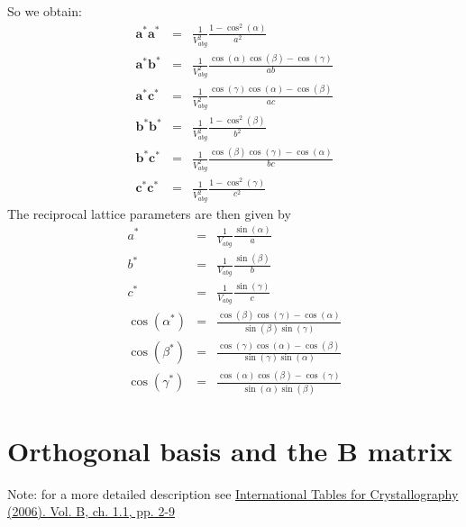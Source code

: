 \documentclass[prb]{revtex4}%
\begin{document}
So we obtain:
\begin{eqnarray}
  \textbf{a}^*\textbf{a}^* &=& \frac{1}{V_{abg} ^2} \frac{1-\cos^2(\alpha)}{a^2}\\
  \textbf{a}^*\textbf{b}^* &=& \frac{1}{V_{abg} ^2} \frac{\cos(\alpha) \cos(\beta)-\cos(\gamma)}{a b} \\
  \textbf{a}^*\textbf{c}^* &=& \frac{1}{V_{abg} ^2} \frac{\cos(\gamma) \cos(\alpha)-\cos(\beta)}{a c}\\
  \textbf{b}^*\textbf{b}^* &=& \frac{1}{V_{abg} ^2} \frac{1-\cos^2(\beta)}{b^2}\\
  \textbf{b}^*\textbf{c}^* &=& \frac{1}{V_{abg} ^2} \frac{\cos(\beta) \cos(\gamma)-\cos(\alpha)}{b c}\\
  \textbf{c}^*\textbf{c}^* &=& \frac{1}{V_{abg} ^2} \frac{1-\cos^2(\gamma)}{c^2}
\end{eqnarray}
The reciprocal lattice parameters are then given by
\begin{eqnarray}
  a^* &=& \frac{1}{V_{abg} } \frac{\sin(\alpha)}{a}\label{as}\\
  b^* &=& \frac{1}{V_{abg} } \frac{\sin(\beta)}{b}\label{bs}\\
  c^* &=& \frac{1}{V_{abg} } \frac{\sin(\gamma)}{c}\label{cs}\\
  \cos(\alpha^*) &=& \frac{\cos(\beta) \cos(\gamma)-\cos(\alpha)}{\sin(\beta)\sin(\gamma)}\label{alphas}\\
  \cos(\beta^*) &=& \frac{\cos(\gamma) \cos(\alpha)-\cos(\beta)}{\sin(\gamma)\sin(\alpha)}\label{betas}\\
  \cos(\gamma^*) &=& \frac{\cos(\alpha) \cos(\beta)-\cos(\gamma)}{\sin(\alpha)\sin(\beta)}\label{gammas}
\end{eqnarray}

\section{Orthogonal basis and the B matrix}\label{Bsection}

Note: for a more detailed description see \href{http://it.iucr.org/Ba/ch1o1v0001/}{International Tables for Crystallography (2006). Vol. B, ch. 1.1, pp. 2-9 }
\end{document}
